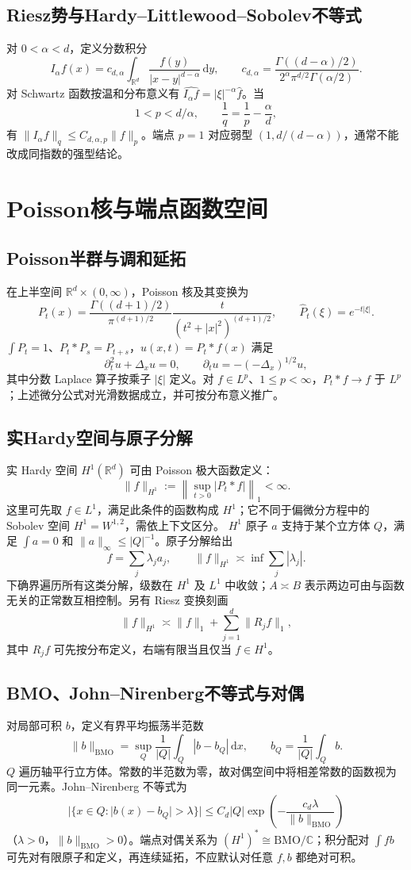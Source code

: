 \documentclass[../main.tex]{subfiles}
\begin{document}
\subsection{Riesz势与Hardy--Littlewood--Sobolev不等式}
对 $0<\alpha<d$，定义分数积分
\[
I_\alpha f(x)=c_{d,\alpha}\int_{\mathbb R^d}\frac{f(y)}{|x-y|^{d-\alpha}}\,\mathrm dy,
\qquad c_{d,\alpha}=\frac{\Gamma((d-\alpha)/2)}{2^\alpha\pi^{d/2}\Gamma(\alpha/2)}.
\]
对 Schwartz 函数按温和分布意义有 $\widehat{I_\alpha f}=|\xi|^{-\alpha}\widehat f$。当
\[
1<p<d/\alpha,\qquad\frac1q=\frac1p-\frac\alpha d,
\]
有 $\|I_\alpha f\|_q\le C_{d,\alpha,p}\|f\|_p$。端点 $p=1$ 对应弱型 $(1,d/(d-\alpha))$，通常不能改成同指数的强型结论。
\section{Poisson核与端点函数空间}
\subsection{Poisson半群与调和延拓}
在上半空间 $\mathbb R^d\times(0,\infty)$，Poisson 核及其变换为
\[
P_t(x)=\frac{\Gamma((d+1)/2)}{\pi^{(d+1)/2}}
\frac{t}{(t^2+|x|^2)^{(d+1)/2}},\qquad\widehat P_t(\xi)=e^{-t|\xi|}.
\]
$\int P_t=1$、$P_t*P_s=P_{t+s}$，$u(x,t)=P_t*f(x)$ 满足
\[
\partial_t^2u+\Delta_xu=0,\qquad\partial_tu=-(-\Delta_x)^{1/2}u,
\]
其中分数 Laplace 算子按乘子 $|\xi|$ 定义。对 $f\in L^p$、$1\le p<\infty$，$P_t*f\to f$ 于 $L^p$；上述微分公式对光滑数据成立，并可按分布意义推广。
\subsection{实Hardy空间与原子分解}
实 Hardy 空间 $H^1(\mathbb R^d)$ 可由 Poisson 极大函数定义：
\[
\|f\|_{H^1}:=\left\|\sup_{t>0}|P_t*f|\right\|_1<\infty.
\]
这里可先取 $f\in L^1$，满足此条件的函数构成 $H^1$；它不同于偏微分方程中的 Sobolev 空间 $H^1=W^{1,2}$，需依上下文区分。
$H^1$ 原子 $a$ 支持于某个立方体 $Q$，满足 $\int a=0$ 和 $\|a\|_\infty\le|Q|^{-1}$。原子分解给出
\[
f=\sum_j\lambda_ja_j,\qquad
\|f\|_{H^1}\asymp\inf\sum_j|\lambda_j|.
\]
下确界遍历所有这类分解，级数在 $H^1$ 及 $L^1$ 中收敛；$A\asymp B$ 表示两边可由与函数无关的正常数互相控制。另有 Riesz 变换刻画
\[
\|f\|_{H^1}\asymp\|f\|_1+\sum_{j=1}^d\|R_jf\|_1,
\]
其中 $R_jf$ 可先按分布定义，右端有限当且仅当 $f\in H^1$。
\subsection{BMO、John--Nirenberg不等式与对偶}
对局部可积 $b$，定义有界平均振荡半范数
\[
\|b\|_{\mathrm{BMO}}=\sup_Q\frac1{|Q|}\int_Q|b-b_Q|\,\mathrm dx,
\qquad b_Q=\frac1{|Q|}\int_Qb.
\]
$Q$ 遍历轴平行立方体。常数的半范数为零，故对偶空间中将相差常数的函数视为同一元素。John--Nirenberg 不等式为
\[
|\{x\in Q:|b(x)-b_Q|>\lambda\}|
\le C_d|Q|\exp\!\left(-\frac{c_d\lambda}{\|b\|_{\mathrm{BMO}}}\right)
\]
（$\lambda>0$，$\|b\|_{\mathrm{BMO}}>0$）。端点对偶关系为 $(H^1)^*\cong\mathrm{BMO}/\mathbb C$；积分配对 $\int fb$ 可先对有限原子和定义，再连续延拓，不应默认对任意 $f,b$ 都绝对可积。
\end{document}
